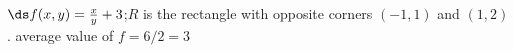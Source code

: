 {$\ds f(x,y) =\frac xy+3$;\quad $R$ is the rectangle with opposite corners $(-1,1)$ and $(1,2)$.
}
{average value of $f = 6/2 = 3$
}
